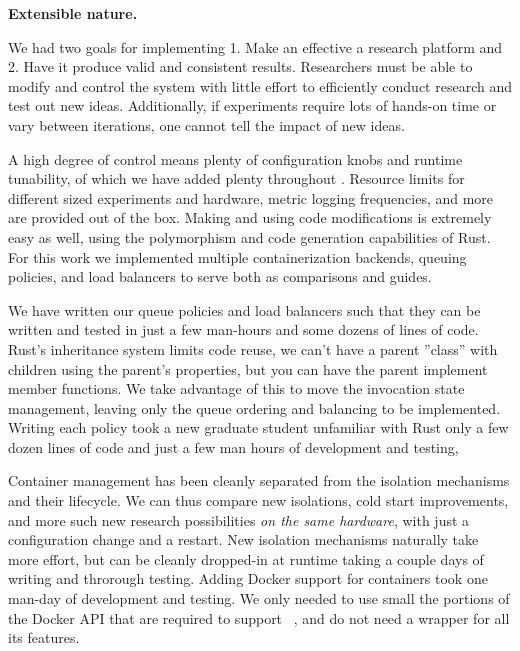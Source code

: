 \textbf{Extensible nature.}


We had two goals for implementing \sysname{} 1. Make an effective a research platform and 2. Have it produce valid and consistent results.
Researchers must be able to modify and control the system with little effort to efficiently conduct research and test out new ideas.
Additionally, if experiments require lots of hands-on time or vary between iterations, one cannot tell the impact of new ideas.

A high degree of control means plenty of configuration knobs and runtime tunability, of which we have added plenty throughout \sysname{}.
Resource limits for different sized experiments and hardware, metric logging frequencies, and more are provided out of the box.
Making and using code modifications is extremely easy as well, using the polymorphism and code generation capabilities of Rust.
For this work we implemented multiple containerization backends, queuing policies, and load balancers to serve both as comparisons and guides.

We have written our queue policies and load balancers such that they can be written and tested in just a few man-hours and some dozens of lines of code.
Rust's inheritance system limits code reuse, we can't have a parent ''class'' with children using the parent's properties, but you can have the parent implement member functions.
We take advantage of this to move the invocation state management, leaving only the queue ordering and balancing to be implemented.
Writing each policy took a new graduate student unfamiliar with Rust only a few dozen lines of code and just a few man hours of development and testing,

Container management has been cleanly separated from the isolation mechanisms and their lifecycle.
We can thus compare new isolations, cold start improvements, and more such new research possibilities \emph{on the same hardware}, with just a configuration change and a restart.
New isolation mechanisms naturally take more effort, but can be cleanly dropped-in at runtime taking a couple days of writing and throrough testing.
Adding Docker support for containers took one man-day of development and testing.
We only needed to use small the portions of the Docker API that are required to support \sysname~, and do not need a wrapper for all its features.


